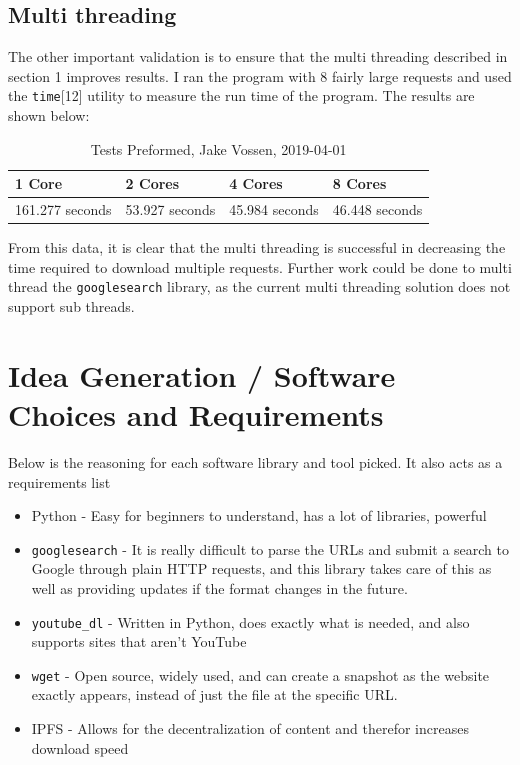 \documentclass{article}
\begin{document}
\subsection{Multi threading}
\label{multithreading}
The other important validation is to ensure that the multi threading
described in section 1 improves results. I ran the program with 8
fairly large requests and used the \texttt{time}[12] utility to measure
the run time of the program. The results are shown below:

\begin{table}[H]
\centering
\caption{\begingroup \fontsize{10pt}{12pt}\selectfont Tests Preformed,
Jake Vossen, 2019-04-01 \endgroup}
\label{my-label}
\begin{tabular}{l|l|l|l}
                                      1 Core  & 2 Cores & 4 Cores & 8
                                                                    Cores
  \\ \hline
 161.277 seconds & 53.927  seconds & 45.984  seconds & 46.448 seconds
\end{tabular}
\end{table}
From this data, it is clear that the multi threading is
successful in decreasing the time required to download multiple requests.
Further work could be done to multi thread the \texttt{googlesearch}
library, as the current multi threading solution does not support sub threads.
\section{Idea Generation / Software Choices and Requirements}

Below is the reasoning for each software library and tool picked. It
also acts as a requirements list

\begin{itemize}
  \item Python - Easy for beginners to understand, has a lot of
    libraries, powerful
  \item \texttt{googlesearch} - It is really difficult to parse the
    URLs and submit a search to Google through plain HTTP requests,
    and this library takes care of this as well as providing updates
    if the format changes in the future.
  \item \texttt{youtube\_dl} - Written in Python, does exactly what is
    needed, and also supports sites that aren't YouTube
  \item \texttt{wget} - Open source, widely used, and can create a
    snapshot as the website exactly appears, instead of just the file
    at the specific URL.
  \item IPFS - Allows for the decentralization of content and therefor
    increases download speed
\end{itemize}
\end{document}
